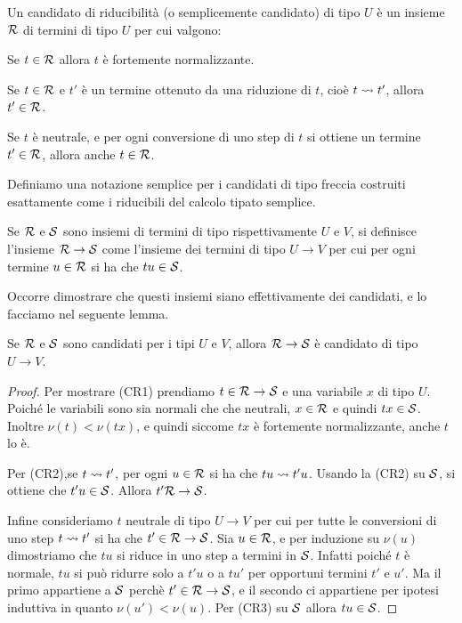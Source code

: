 \documentclass[]{marticle}
\begin{document}
\begin{block}[Definizione]
    Un candidato di riducibilit\`a (o semplicemente candidato) di tipo $U$ \`e
    un insieme $\mathcal{R}$ di termini di tipo $U$ per cui valgono:
    \begin{nlist}[CR1]
        \item Se $t\in\mathcal{R}$ allora $t$ \`e fortemente normalizzante.
        \item Se $t\in\mathcal{R}$ e $t'$ \`e un termine ottenuto da una riduzione
            di $t$, cio\`e $t\rightsquigarrow t'$, allora $t'\in\mathcal{R}$.
        \item  Se $t$ \`e neutrale, e per ogni conversione di uno step di $t$ si
            ottiene un termine $t'\in\mathcal{R}$, allora anche $t\in\mathcal{R}$.
    \end{nlist}
\end{block}

Definiamo una notazione semplice per i candidati di tipo freccia costruiti
esattamente come i riducibili del calcolo tipato semplice.
\begin{block}[Definizione]
    Se $\mathcal{R}$ e $\mathcal{S}$ sono insiemi di termini di tipo rispettivamente $U$
    e $V$, si definisce l'insieme $\mathcal{R}\rightarrow\mathcal{S}$ come l'insieme dei
    termini di tipo $U\rightarrow V$ per cui per ogni termine $u\in\mathcal{R}$ si
    ha che $tu\in\mathcal{S}$.
\end{block}

Occorre dimostrare che questi insiemi siano effettivamente dei candidati, e lo
facciamo nel seguente lemma.
\begin{block} [Lemma]
    Se $\mathcal{R}$ e $\mathcal{S}$ sono candidati per i tipi $U$ e $V$, allora
    $\mathcal{R}\rightarrow\mathcal{S}$ \`e candidato di tipo $U\rightarrow V$.
\end{block}
\begin{proof}
    Per mostrare (CR1) prendiamo $t\in\mathcal{R}\rightarrow\mathcal{S}$ e una variabile
    $x$ di tipo $U$. Poich\'e le variabili sono sia normali che che neutrali,
    $x\in \mathcal{R}$ e quindi $tx\in\mathcal{S}$. Inoltre $\nu(t)<\nu(tx)$, e quindi
    siccome $tx$ \`e fortemente normalizzante, anche $t$ lo \`e.

    Per (CR2),se $t\rightsquigarrow t'$, per ogni $u \in \mathcal{R}$ si ha che $tu\rightsquigarrow
    t'u$. Usando la (CR2) su $\mathcal{S}$, si ottiene che $t'u\in\mathcal{S}$. Allora
    $t'\mathcal{R}\rightarrow\mathcal{S}$.

    Infine consideriamo $t$ neutrale di tipo $U\rightarrow V$ per cui per tutte
    le conversioni di uno step $t\rightsquigarrow t'$ si ha che $t' \in
    \mathcal{R}\rightarrow\mathcal{S}$. Sia $u\in\mathcal{R}$, e per induzione su $\nu(u)$
    dimostriamo che $tu$ si riduce in uno step a termini in $\mathcal{S}$. Infatti
    poich\'e $t$ \`e normale, $tu$ si pu\`o ridurre solo a $t'u$ o a $tu'$ per
    opportuni termini $t'$ e $u'$. Ma il primo appartiene a $\mathcal{S}$ perch\`e
    $t'\in\mathcal{R}\rightarrow\mathcal{S}$, e il secondo ci appartiene per ipotesi
    induttiva in quanto $\nu(u')<\nu(u)$. Per (CR3) su $\mathcal{S}$ allora
    $tu\in\mathcal{S}$. 
\end{proof}
\end{document}
